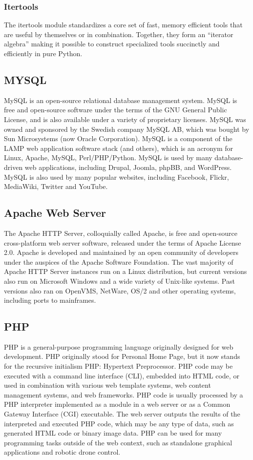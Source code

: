 \documentclass[12pt]{article}
\begin{document}
\subsubsection{Itertools}
The itertools module standardizes a core set of fast, memory efficient tools that are useful by themselves or in combination. Together, they form an “iterator algebra” making it possible to construct specialized tools succinctly and efficiently in pure Python.

\subsection{MYSQL}
MySQL is an open-source relational database management system. MySQL is free and open-source software under the terms of the GNU General Public License, and is also available under a variety of proprietary licenses. MySQL was owned and sponsored by the Swedish company MySQL AB, which was bought by Sun Microsystems (now Oracle Corporation). MySQL is a component of the LAMP web application software stack (and others), which is an acronym for Linux, Apache, MySQL, Perl/PHP/Python. MySQL is used by many database-driven web applications, including Drupal, Joomla, phpBB, and WordPress. MySQL is also used by many popular websites, including Facebook, Flickr, MediaWiki, Twitter and YouTube.

\subsection{Apache Web Server}
The Apache HTTP Server, colloquially called Apache, is free and open-source cross-platform web server software, released under the terms of Apache License 2.0. Apache is developed and maintained by an open community of developers under the auspices of the Apache Software Foundation. The vast majority of Apache HTTP Server instances run on a Linux distribution, but current versions also run on Microsoft Windows and a wide variety of Unix-like systems. Past versions also ran on OpenVMS, NetWare, OS/2 and other operating systems, including ports to mainframes.

\subsection{PHP}
PHP is a general-purpose programming language originally designed for web development. PHP originally stood for Personal Home Page,
but it now stands for the recursive initialism PHP: Hypertext Preprocessor. PHP code may be executed with a command line interface (CLI), embedded into HTML code, or used in combination with various web template systems, web content management systems, and web frameworks. PHP code is usually processed by a PHP interpreter implemented as a module in a web server or as a Common Gateway Interface (CGI) executable. The web server outputs the results of the interpreted and executed PHP code, which may be any type of data, such as generated HTML code or binary image data. PHP can be used for many programming tasks outside of the web context, such as standalone graphical applications and robotic drone control.
\end{document}
